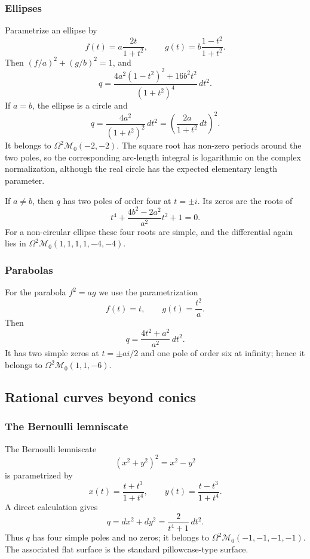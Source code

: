 \documentclass[reqno]{amsart}
\theoremstyle{definition}
\theoremstyle{remark}
\theoremstyle{definition}
\theoremstyle{definition}
\theoremstyle{definition}
\begin{document}
\subsubsection{Ellipses}

Parametrize an ellipse by
\[
        f(t)=a\frac{2t}{1+t^{2}},\qquad
        g(t)=b\frac{1-t^{2}}{1+t^{2}}.
\]
Then $(f/a)^2+(g/b)^2=1$, and
\[
        q=\frac{4a^{2}(1-t^{2})^{2}+16b^{2}t^{2}}{(1+t^{2})^{4}}\,dt^{2}.
\]
If $a=b$, the ellipse is a circle and
\[
        q=\frac{4a^{2}}{(1+t^{2})^{2}}\,dt^{2}
          =\left(\frac{2a}{1+t^{2}}\,dt\right)^{2}.
\]
It belongs to $\Omega^{2}\mathcal{M}_{0}(-2,-2)$.  The square root has
non-zero periods around the two poles, so the corresponding arc-length
integral is logarithmic on the complex normalization, although the real circle
has the expected elementary length parameter.

If $a\ne b$, then $q$ has two poles of order four at $t=\pm i$.  Its zeros are
the roots of
\[
        t^{4}+\frac{4b^{2}-2a^{2}}{a^{2}}t^{2}+1=0.
\]
For a non-circular ellipse these four roots are simple, and the differential
again lies in $\Omega^{2}\mathcal{M}_{0}(1,1,1,1,-4,-4)$.

\subsubsection{Parabolas}

For the parabola $f^{2}=ag$ we use the parametrization
\[
        f(t)=t,\qquad g(t)=\frac{t^{2}}{a}.
\]
Then
\[
        q=\frac{4t^{2}+a^{2}}{a^{2}}\,dt^{2}.
\]
It has two simple zeros at $t=\pm ai/2$ and one pole of order six at infinity;
hence it belongs to $\Omega^{2}\mathcal{M}_{0}(1,1,-6)$.

\subsection{Rational curves beyond conics}

\subsubsection{The Bernoulli lemniscate}

The Bernoulli lemniscate
\[
        (x^{2}+y^{2})^{2}=x^{2}-y^{2}
\]
is parametrized by
\[
        x(t)=\frac{t+t^{3}}{1+t^{4}},\qquad
        y(t)=\frac{t-t^{3}}{1+t^{4}}.
\]
A direct calculation gives
\[
        q=dx^{2}+dy^{2}=\frac{2}{t^{4}+1}\,dt^{2}.
\]
Thus $q$ has four simple poles and no zeros; it belongs to
$\Omega^{2}\mathcal{M}_{0}(-1,-1,-1,-1)$.  The associated flat surface is the
standard pillowcase-type surface.
\end{document}
